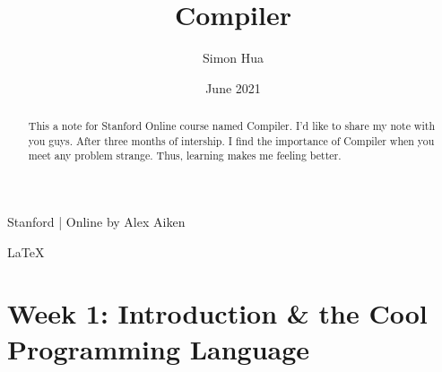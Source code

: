\documentclass[12pt, a4paper]{article}
\title{Compiler}
\author{Simon Hua}
\date{June 2021}
\begin{document}
    \maketitle
    \vspace*{\fill}
        \centering
        {
            \normalfont
            \textcolor{StanfordRed}{Stanford} | Online
        }
        by Alex Aiken

        \LaTeX{}
        \thispagestyle{empty}
    \newpage
    \clearpage
    \begin{abstract}
        This a note for Stanford Online course named Compiler. I'd like to share my note with you guys.
        After three months of intership. I find the importance of Compiler when you meet any problem strange.
        Thus, learning makes me feeling better.
    \end{abstract}

    \section{\normalsize{Week 1: Introduction \& the Cool Programming Language}}
\end{document}

